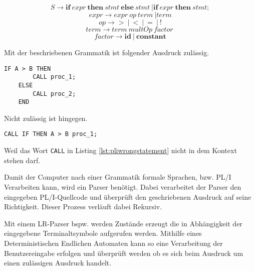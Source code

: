 \begin{center}
	\begin{equation}\label{eqn:start}
		S \to \mathbf{if}\: expr\: \mathbf{then}\: stmt\: \mathbf{else}\: stmt\: | \mathbf{if}\: expr\: \mathbf{then}\: stmt;
	\end{equation}
	\begin{equation}
		expr \to expr\: op\: term\: | term
	\end{equation}
	\begin{equation}
		op \to \mathbf{>}\: |\: \mathbf{<}\: |\: \mathbf{=}\: |\: \mathbf{!}
	\end{equation}
	\begin{equation}
		term \to term\: multOp\: factor\:
	\end{equation}
	\begin{equation}
		factor \to \mathbf{id}\: |\: \mathbf{constant}
	\end{equation}
\end{center}

Mit der beschriebenen Grammatik ist folgender Ausdruck zulässig.

\begin{lstlisting}[language=PL/I, caption=If Statement PL/I, label={lst:pliifstatement}]
	IF A > B THEN
		CALL proc_1;
	ELSE
		CALL proc_2;
	END
\end{lstlisting}

Nicht zulässig ist hingegen.

\begin{lstlisting}[language=PL/I, caption=Wrong Statement PL/I, label={lst:pliwrongstatement}]
	CALL IF THEN A > B proc_1;
\end{lstlisting}

Weil das Wort \verb+CALL+ in Listing \ref{lst:pliwrongstatement} nicht in dem Kontext stehen darf.

Damit der Computer nach einer Grammatik formale Sprachen, bzw. PL/I Verarbeiten kann, wird ein Parser benötigt.
Dabei verarbeitet der Parser den eingegeben PL/I-Quellcode und überprüft den geschriebenen Ausdruck auf seine Richtigkeit.
Dieser Prozess verläuft dabei Rekursiv. 


Mit einem LR-Parser bspw. werden Zustände erzeugt die in Abhängigkeit der eingegebene Terminaltsymbole aufgerufen werden.
Mithilfe eines Deterministischen Endlichen Automaten kann so eine Verarbeitung der Benutzereingabe erfolgen und überprüft 
werden ob es sich beim Ausdruck um einen zulässigen Ausdruck handelt.

